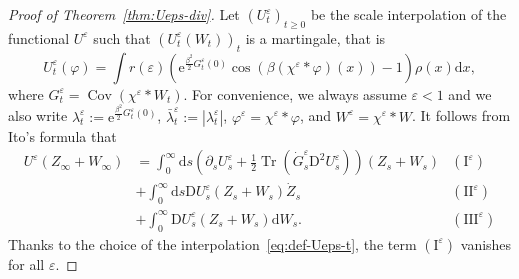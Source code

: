 \documentclass[11pt, a4paper]{scrartcl}
\numberwithin{equation}{section}
\theoremstyle{plain}
\theoremstyle{remark}
\newcommand{\Iota}{\mathrm{I}}
\newcommand{\assign}{:=}
\newcommand{\mathD}{\mathrm{D}}
\newcommand{\mathd}{\mathrm{d}}
\newcommand{\mathe}{\mathrm{e}}
\newcommand{\tmop}[1]{\ensuremath{\operatorname{#1}}}
\begin{document}
\begin{proof}[Proof of Theorem~\ref{thm:Ueps-div}]
  Let $(U_t^{\varepsilon})_{t \geqslant 0}$ be the scale interpolation of the functional
  $U^{\varepsilon}$ such that $(U_t^{\varepsilon} (W_t))_t$ is a martingale,
  that is
  \begin{equation}
    U_t^{\varepsilon} (\varphi) = \int r (\varepsilon) \left(
    \mathe^{\frac{\beta^2}{2} G_t^{\varepsilon} (0)} \cos (\beta
    (\chi^{\varepsilon} \ast \varphi) (x)) - 1 \right) \rho (x) \mathd x,
    \label{eq:def-Ueps-t}
  \end{equation}
  where $G_t^{\varepsilon} = \tmop{Cov} (\chi^{\varepsilon} \ast W_t)$. For
  convenience, we always assume $\varepsilon < 1$ and we also write
  $\lambda^{\varepsilon}_t \assign \mathe^{\frac{\beta^2}{2} G^{\varepsilon}_t
  (0)}$, $\bar{\lambda}^{\varepsilon}_t\assign |\lambda^{\varepsilon}_t|$, $\varphi^{\varepsilon} = \chi^{\varepsilon} \ast \varphi$, and
  $W^{\varepsilon} = \chi^{\varepsilon} \ast W$. It follows from Ito's formula
  that
  \[ \begin{aligned}
       U^{\varepsilon} (Z_{\infty} + W_{\infty}) &= \int_0^{\infty} \mathd
       s \left( \partial_s U^{\varepsilon}_s + \frac{1}{2} \tmop{Tr}
       (\dot{G}^{\varepsilon}_s \mathD^2 U^{\varepsilon}_s) \right) (Z_s +
       W_s) & (\Iota^{\varepsilon})\\
       & + \int_0^{\infty} \mathd s \mathD U^{\varepsilon}_s (Z_s + W_s)
       \dot{Z}_s & (\Iota \Iota^{\varepsilon})\\
       & + \int_0^{\infty} \mathD U^{\varepsilon}_s (Z_s + W_s)
       \mathd W_s . & (\Iota \Iota \Iota^{\varepsilon})
     \end{aligned} \]
  Thanks to the choice of the interpolation~\eqref{eq:def-Ueps-t}, the term
  $(\Iota^{\varepsilon})$ vanishes for all $\varepsilon$.
  

\end{proof}
\end{document}
